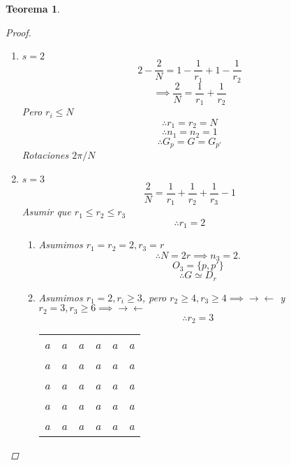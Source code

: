 \documentclass[11pt]{book}
\newcommand{\contr}{\rightarrow\leftarrow}
\newtheorem{thm}{Teorema}[section]
\theoremstyle{definition}
\begin{document}
\begin{thm}
\begin{proof}
\begin{enumerate}[label=(\arabic* órbitas):]
			\item $s=2$
			\[2-\frac{2}{N}=1-\frac{1}{r_1}+1-\frac{1}{r_2}\]
			\[\implies\frac{2}{N}=\frac{1}{r_1}+\frac{1}{r_2}\]
			Pero $r_i\leq N$
			\[\therefore r_1=r_2=N\]
			\[\therefore n_1=n_2=1\]
			\[\therefore G_p=G=G_{p'}\]
			Rotaciones $2\pi/N$

			\item $s=3$
			\[\frac{2}{N}=\frac{1}{r_1}+\frac{1}{r_2}+\frac{1}{r_3}-1\]
			Asumir que $r_1\leq r_2\leq r_3$
			\[\therefore r_1=2\]
			\begin{enumerate}[label=(\roman*)]
				\item Asumimos $r_1=r_2=2,r_3=r$
				\[\therefore N=2r\implies n_3=2.\]
				\[O_3=\{p,p'\}\]
				\[\therefore G\simeq D_r\]

				\item Asumimos $r_1=2,r_i\geq 3$, pero $r_2\geq 4, r_3\geq 4\implies \contr$ y $r_2=3, r_3\geq 6\implies \contr$
				\[\therefore r_2=3\]
				\begin{center}
					\begin{tabular}{ c | c | c | c | c | c }
						a & a & a & a & a & a \\
						a & a & a & a & a & a \\
						a & a & a & a & a & a \\
						a & a & a & a & a & a \\
						a & a & a & a & a & a
					\end{tabular}
				\end{center}
			\end{enumerate}
		\end{enumerate}
	\end{proof}
\end{thm}
\end{document}
